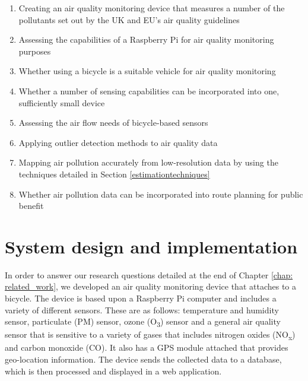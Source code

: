 \documentclass[11pt,twosided,a4paper]{report}
\begin{document}
\begin{enumerate}
\item Creating an air quality monitoring device that measures a number of the pollutants set out by the UK and EU's air quality guidelines
\item Assessing the capabilities of a Raspberry Pi for air quality monitoring purposes
\item Whether using a bicycle is a suitable vehicle for air quality monitoring
\item Whether a number of sensing capabilities can be incorporated into one, sufficiently small device
\item Assessing the air flow needs of bicycle-based sensors
\item Applying outlier detection methods to air quality data %
\item Mapping air pollution accurately from low-resolution data by using the techniques detailed in Section \ref{estimationtechniques}
\item Whether air pollution data can be incorporated into route planning for public benefit
\end{enumerate}



\chapter{System design and implementation} \label{chap: system_design}

In order to answer our research questions detailed at the end of Chapter \ref{chap: related_work}, we developed an air quality monitoring device that attaches to a bicycle. The device is based upon a Raspberry Pi computer and includes a variety of different sensors. These are as follows: temperature and humidity sensor, particulate (PM) sensor, ozone (O\textsubscript{3}) sensor and a general air quality sensor that is sensitive to a variety of gases that includes nitrogen oxides (NO\textsubscript{x}) and carbon monoxide (CO). It also has a GPS module attached that provides geo-location information. The device sends the collected data to a database, which is then processed and displayed in a web application. 
\end{document}
